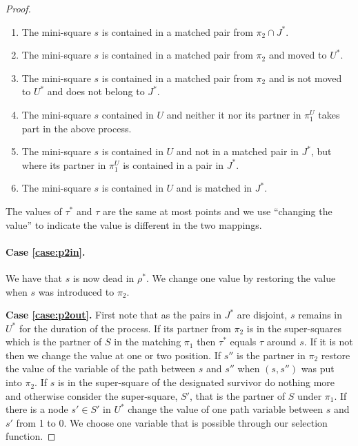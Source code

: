 \documentclass{article}\usepackage[a4paper,margin=20mm]{geometry}
\begin{document}
\begin{proof}
\begin{enumerate}

\item The mini-square $s$ is contained in a matched pair from $\pi_2 \cap J^*$. \label{case:p2in}

\item The mini-square $s$ is contained in a matched pair from $\pi_2$ and 
moved to $U^*$. \label{case:p2out}

\item The mini-square $s$ is contained in a matched pair from $\pi_2$ and 
is not moved to $U^*$ and does not belong to $J^*$. \label{case:p2outnot}

\item The mini-square $s$ contained in $U$ and neither it nor its
partner in $\pi_1^U$ takes part in the above process. \label{case:p1not}

\item The mini-square $s$ is contained in $U$ and not in a matched
pair in $J^*$, but where its partner in $\pi_1^U$ is contained in 
a pair in $J^*$. \label{case:p1notbutp}

\item The mini-square $s$ is contained in $U$ and is matched in $J^*$.
\label{case:p1yes}

\end{enumerate}

The values of $\tau^*$ and $\tau$ are the same at most points
and we use ``changing the value'' to indicate the value
is different in the two mappings.

\paragraph{Case \ref{case:p2in}.}  We have that $s$ is now dead in $\rho^*$.
We change one value by restoring the value when $s$ was
introduced to $\pi_2$.

\noindent
{\bf Case \ref{case:p2out}.}  First note that as the pairs
in $J^*$ are disjoint, $s$ remains in $U^*$ for the duration
of the process.  If its partner
from $\pi_2$ is in the super-squares which is the
partner of $S$ in the matching $\pi_1$
then $\tau^*$ equals $\tau$ around $s$.  If it is not then
we change the value at one or two position.
If $s''$ is the partner in $\pi_2$ restore the value of
the variable of the path between $s$ and $s''$ when
$(s,s'')$ was put into $\pi_2$.   If $s$ is in the super-square
of the designated survivor do nothing more and otherwise consider the
super-square, $S'$, that is the partner of $S$
under $\pi_1$.  If there is a node $s' \in S'$ in $U^*$
change the value of one path variable between $s$ and $s'$
from 1 to 0.  We choose one variable that is possible
through our selection function.


\end{proof}
\end{document}
